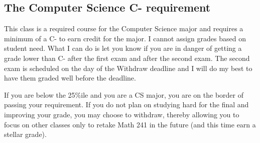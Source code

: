 \subsection*{The Computer Science C- requirement}

This class is a required course for the Computer Science major and requires a minimum of a C- to earn credit for the major. I cannot assign grades based on student need. What I can do is let you know if you are in danger of getting a grade lower than C- after the first exam and after the second exam. The second exam is scheduled on the day of the Withdraw deadline and I will do my best to have them graded well before the deadline. 

If you are below the 25\%ile and you are a CS major, you are on the border of passing your requirement. If you do not plan on studying hard for the final and improving your grade, you may choose to withdraw, thereby allowing you to focus on other classes only to retake Math 241 in the future (and this time earn a stellar grade).